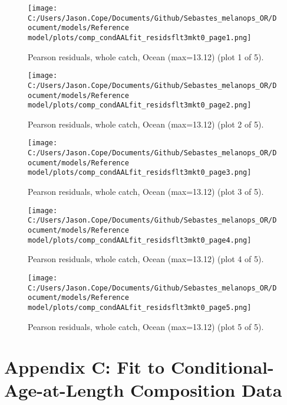 \documentclass[11pt,
  english,
  letterpaper,
]{article}
\begin{document}
\begin{figure}
\centering
\texttt{[image: C:/Users/Jason.Cope/Documents/Github/Sebastes\_melanops\_OR/Document/models/Reference model/plots/comp\_condAALfit\_residsflt3mkt0\_page1.png]}
\caption{Pearson residuals, whole catch, Ocean (max=13.12) (plot 1 of 5).\label{fig:comp_condAALfit_residsflt3mkt0_page1}}
\end{figure}

\begin{figure}
\centering
\texttt{[image: C:/Users/Jason.Cope/Documents/Github/Sebastes\_melanops\_OR/Document/models/Reference model/plots/comp\_condAALfit\_residsflt3mkt0\_page2.png]}
\caption{Pearson residuals, whole catch, Ocean (max=13.12) (plot 2 of 5).\label{fig:comp_condAALfit_residsflt3mkt0_page2}}
\end{figure}

\begin{figure}
\centering
\texttt{[image: C:/Users/Jason.Cope/Documents/Github/Sebastes\_melanops\_OR/Document/models/Reference model/plots/comp\_condAALfit\_residsflt3mkt0\_page3.png]}
\caption{Pearson residuals, whole catch, Ocean (max=13.12) (plot 3 of 5).\label{fig:comp_condAALfit_residsflt3mkt0_page3}}
\end{figure}

\begin{figure}
\centering
\texttt{[image: C:/Users/Jason.Cope/Documents/Github/Sebastes\_melanops\_OR/Document/models/Reference model/plots/comp\_condAALfit\_residsflt3mkt0\_page4.png]}
\caption{Pearson residuals, whole catch, Ocean (max=13.12) (plot 4 of 5).\label{fig:comp_condAALfit_residsflt3mkt0_page4}}
\end{figure}

\begin{figure}
\centering
\texttt{[image: C:/Users/Jason.Cope/Documents/Github/Sebastes\_melanops\_OR/Document/models/Reference model/plots/comp\_condAALfit\_residsflt3mkt0\_page5.png]}
\caption{Pearson residuals, whole catch, Ocean (max=13.12) (plot 5 of 5).\label{fig:comp_condAALfit_residsflt3mkt0_page5}}
\end{figure}

\clearpage

\hypertarget{app-c}{%
\section{Appendix C: Fit to Conditional-Age-at-Length Composition Data}\label{app-c}}
\end{document}
